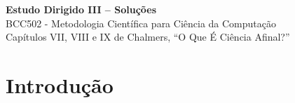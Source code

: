 \documentclass[10pt]{extarticle}
\begin{document}
\begin{center}
    {\LARGE\bfseries\color{darkblue}Estudo Dirigido III -- Soluções}\\[0.3cm]
    {\large\color{accentorange} BCC502 - Metodologia Científica para Ciência da Computação}\\[0.3cm]
    {\normalsize\color{darkblue} Capítulos VII, VIII e IX de Chalmers, \enquote{O Que É Ciência Afinal?}}\\[0.5cm]
\end{center}

\section{Introdução}
\end{document}
